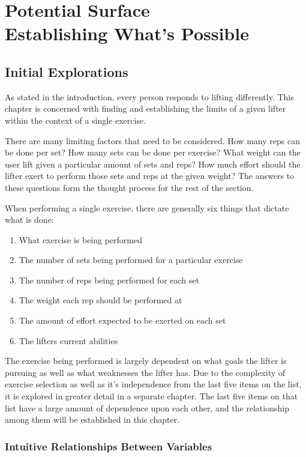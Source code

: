 \part{
    Potential Surface
    \\
    \large{Establishing What's Possible}
}
\label{sec:PotentialSurface}

\chapter{Initial Explorations}

As stated in the introduction, every person responds to lifting differently. This chapter is concerned with finding and establishing the limits of a given lifter within the context of a single exercise.

There are many limiting factors that need to be considered. How many reps can be done per set? How many sets can be done per exercise? What weight can the user lift given a particular amount of sets and reps? How much effort should the lifter exert to perform those sets and reps at the given weight? The answers to these questions form the thought process for the rest of the section.

When performing a single exercise, there are generally six things that dictate what is done:
\begin{enumerate}
    \item What exercise is being performed
    \item The number of sets being performed for a particular exercise
    \item The number of reps being performed for each set
    \item The weight each rep should be performed at
    \item The amount of effort expected to be exerted on each set
    \item The lifters current abilities
\end{enumerate}

The exercise being performed is largely dependent on what goals the lifter is pursuing as well as what weaknesses the lifter has. Due to the complexity of exercise selection as well as it's independence from the last five items on the list, it is explored in greater detail in a separate chapter. The last five items on that list have a large amount of dependence upon each other, and the relationship among them will be established in this chapter.

\section{Intuitive Relationships Between Variables}
\label{sec:PotentialSurfaceIntuitiveRelationshipsBetweenVariables}

